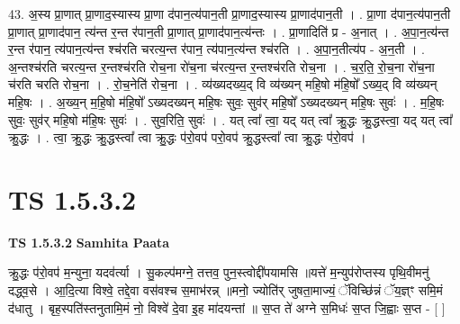 \documentclass[17pt]{extarticle}
\begin{document}
43. अ॒स्य प्रा॒णात् प्रा॒णाद॒स्यास्य प्रा॒णा द॑पान॒त्य॑पान॒ती प्रा॒णाद॒स्यास्य प्रा॒णाद॑पान॒ती । . प्रा॒णा द॑पान॒त्य॑पान॒ती प्रा॒णात् प्रा॒णाद॑पान॒ त्य॑न्त र॒न्त र॑पान॒ती प्रा॒णात् प्रा॒णाद॑पान॒त्य॑न्तः । . प्रा॒णादिति॑ प्र - अ॒नात् । . अ॒पा॒न॒त्य॑न्त र॒न्त र॑पान॒ त्य॑पान॒त्य॑न्त श्च॑रति चरत्य॒न्त र॑पान॒ त्य॑पान॒त्य॑न्त श्च॑रति । . अ॒पा॒न॒तीत्य॑प - अ॒न॒ती । . अ॒न्तश्च॑रति चरत्य॒न्त र॒न्तश्च॑रति रोच॒ना रो॑च॒ना च॑रत्य॒न्त र॒न्तश्च॑रति रोच॒ना । . च॒र॒ति॒ रो॒च॒ना रो॑च॒ना च॑रति चरति रोच॒ना । . रो॒च॒नेति॑ रोच॒ना । . व्य॑ख्यदख्य॒द् वि व्य॑ख्यन् महि॒षो म॑हि॒षो᳚ ऽख्य॒द् वि व्य॑ख्यन् महि॒षः । . अ॒ख्य॒न् म॒हि॒षो म॑हि॒षो᳚ ऽख्यदख्यन् महि॒षः सुवः॒ सुव॑र् महि॒षो᳚ ऽख्यदख्यन् महि॒षः सुवः॑ । . म॒हि॒षः सुवः॒ सुव॑र् महि॒षो म॑हि॒षः सुवः॑ । . सुव॒रिति॒ सुवः॑ । . यत् त्वा᳚ त्वा॒ यद् यत् त्वा᳚ क्रु॒द्धः क्रु॒द्धस्त्वा॒ यद् यत् त्वा᳚ क्रु॒द्धः । . त्वा॒ क्रु॒द्धः क्रु॒द्धस्त्वा᳚ त्वा क्रु॒द्धः प॑रो॒वप॑ परो॒वप॑ क्रु॒द्धस्त्वा᳚ त्वा क्रु॒द्धः प॑रो॒वप॑ । \newline
\pagebreak
{}
\section*{ TS 1.5.3.2 }

\textbf{TS 1.5.3.2 } \newline
\textbf{Samhita Paata} \newline

क्रु॒द्धः प॑रो॒वप॑ म॒न्युना॒ यदव॑र्त्या । सु॒कल्प॑मग्ने॒ तत्तव॒ पुन॒स्त्वोद्दी॑पयामसि ॥यत्ते॑ म॒न्युप॑रोप्तस्य पृथि॒वीमनु॑ दद्ध्व॒से । आ॒दि॒त्या विश्वे॒ तद्दे॒वा वस॑वश्च स॒माभ॑रन्न् ॥मनो॒ ज्योति॑र् जुषता॒माज्यं॒ ॅविच्छि॑न्नं ॅय॒ज्ञ्ꣳ समि॒मं द॑धातु । बृह॒स्पति॑स्तनुतामि॒मं नो॒ विश्वे॑ दे॒वा इ॒ह मा॑दयन्तां ॥ स॒प्त ते॑ अग्ने स॒मिधः॑ स॒प्त जि॒ह्वाः स॒प्त - [ ] \newline
\end{document}
